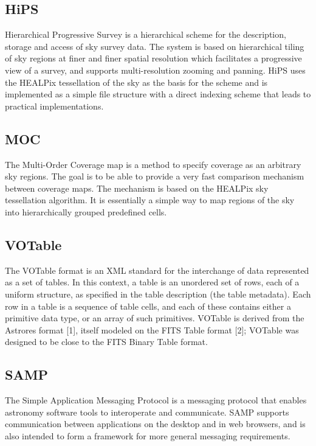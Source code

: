 \documentclass[11pt,a4paper]{ivoa}
\begin{document}
\subsection{HiPS}

Hierarchical Progressive Survey is a hierarchical scheme for the description, storage and 
access of sky survey data. The system is based on hierarchical tiling of sky regions at 
finer and finer spatial resolution which facilitates a progressive view of a survey, and 
supports multi-resolution zooming and panning. HiPS uses the HEALPix tessellation of the 
sky as the basis for the scheme and is implemented as a simple file structure with a direct 
indexing scheme that leads to practical implementations. 

\subsection{MOC}

The Multi-Order Coverage map is a method to specify coverage as an arbitrary sky regions. 
The goal is to be able to provide a very fast comparison mechanism between coverage maps. 
The mechanism is based on the HEALPix sky tessellation algorithm. It is essentially a 
simple way to map regions of the sky into hierarchically grouped predefined cells. 

\subsection{VOTable} 

The VOTable format is an XML standard for the interchange of data represented as a set of tables. 
In this context, a table is an unordered set of rows, each of a uniform structure, as specified 
in the table description (the table metadata). Each row in a table is a sequence of table cells, 
and each of these contains either a primitive data type, or an array of such primitives. VOTable 
is derived from the Astrores format [1], itself modeled on the FITS Table format [2]; VOTable 
was designed to be close to the FITS Binary Table format. 

\subsection{SAMP}

The Simple Application Messaging Protocol is a messaging protocol that enables astronomy 
software tools to interoperate and communicate. SAMP supports communication between 
applications on the desktop and in web browsers, and is also intended to form a framework 
for more general messaging requirements. 
\end{document}

